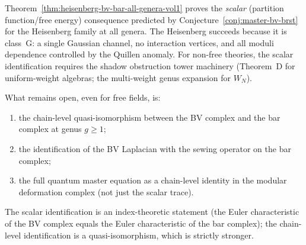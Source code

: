 \begin{remark}
\label{rem:heisenberg-bv-bar-scope}
Theorem~\ref{thm:heisenberg-bv-bar-all-genera-vol1} proves the
\emph{scalar} \textup{(}partition function\slash free energy\textup{)}
consequence predicted by
Conjecture~\ref{conj:master-bv-brst} for the Heisenberg
family at all genera.
The Heisenberg succeeds because it is class~G:
a single Gaussian channel, no interaction vertices, and
all moduli dependence controlled by the Quillen anomaly.
For non-free theories, the scalar identification requires
the shadow obstruction tower machinery
\textup{(}Theorem~D for uniform-weight algebras;
the multi-weight genus expansion for $W_N$\textup{)}.

What remains open, even for
free fields, is:
\begin{enumerate}[label=\textup{(\roman*)},nosep]
\item the chain-level quasi-isomorphism between the BV complex and
 the bar complex at genus $g \geq 1$;
\item the identification of the BV Laplacian with the sewing
 operator on the bar complex;
\item the full quantum master equation as a chain-level identity
 in the modular deformation complex
 \textup{(}not just the scalar trace\textup{)}.
\end{enumerate}
The scalar identification is an index-theoretic statement
(the Euler characteristic of the BV complex equals the Euler
characteristic of the bar complex); the chain-level identification
is a quasi-isomorphism, which is strictly stronger.
\end{remark}

